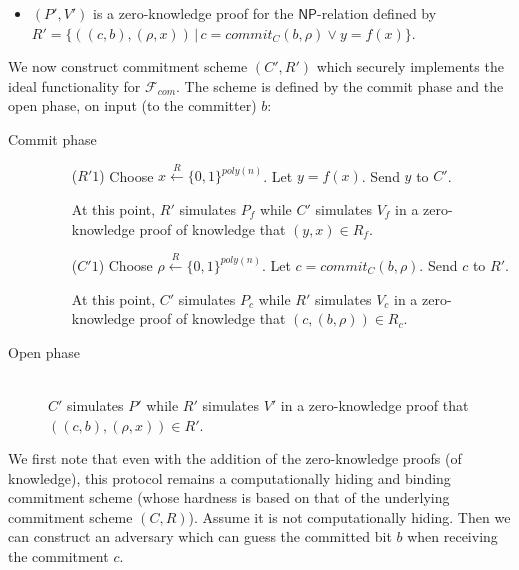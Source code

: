 \documentclass[draft]{article}
\newcommand{\class}[1]{{\ensuremath{\mathsf{#1}}}}
\newcommand{\getr}{\overset{R}{\gets}}
\newcommand{\getrsingle}{\getr\{0, 1\}}
\newcommand{\getrpoly}{\getrsingle^{poly(n)}}
\newcommand{\NP}{\class{NP}}
\begin{document}
\begin{enumerate}
\begin{enumerate}
\begin{itemize}
    \item $(P', V')$ is a zero-knowledge proof for the \NP-relation defined by $R'=\{((c, b), (\rho, x)) \,|\, c = commit_C(b, \rho) \lor y = f(x)\}$.
    \end{itemize}
    We now construct commitment scheme $(C', R')$ which securely implements the ideal functionality for $\mathcal{F}_{com}$.
    The scheme is defined by the commit phase and the open phase, on input (to the committer) $b$:
    \begin{description}
    \item[Commit phase] \hfill
      \begin{enumerate}
      \item[($R'1$)]
        Choose $x\getrpoly$.
        Let $y = f(x)$.
        Send $y$ to $C'$.

        At this point, $R'$ simulates $P_f$ while $C'$ simulates $V_f$ in a zero-knowledge proof of knowledge that $(y, x)\in R_f$.
      \item[($C'1$)]
        Choose $\rho\getrpoly$.
        Let $c=commit_C(b, \rho)$.
        Send $c$ to $R'$.

        At this point, $C'$ simulates $P_c$ while $R'$ simulates $V_c$ in a zero-knowledge proof of knowledge that $(c, (b, \rho))\in R_c$.
      \end{enumerate}
    \item[Open phase] \hfill \\
      $C'$ simulates $P'$ while $R'$ simulates $V'$ in a zero-knowledge proof that $((c, b), (\rho, x))\in R'$.
    \end{description}
    We first note that even with the addition of the zero-knowledge proofs (of knowledge), this protocol remains a computationally hiding and binding commitment scheme (whose hardness is based on that of the underlying commitment scheme $(C, R)$).
    Assume it is not computationally hiding.
    Then we can construct an adversary which can guess the committed bit $b$ when receiving the commitment $c$.


\end{enumerate}
\end{enumerate}
\end{document}
